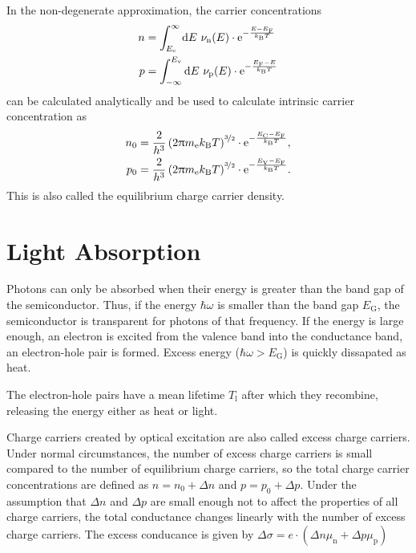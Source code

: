 In the non-degenerate approximation, the carrier concentrations
\begin{align*}
	n &= \int_{E_\text{c}}^\infty\d E\ \nu_\text{n}(E)\cdot\e^{-\frac{E-E_\text{F}}{k_\text{B}T}} \\
	p &= \int_{-\infty}^{E_\text{v}}\d E\ \nu_\text{p}(E)\cdot\e^{-\frac{E_\text{F}-E}{k_\text{B}T}}
\end{align*}
can be calculated analytically and be used to calculate intrinsic carrier concentration as
\begin{alignat*}{1}
	n_0 &= \frac{2}{h^3}	\left(2 \uppi m_\text{e} k_\text{B} T \right)^{\nicefrac{3}{2}} \cdot	\mathrm{e}^{-\frac{E_\text{C} - E_\text{F}}{k_\text{B}T}},\\
	p_0 &= \frac{2}{h^3}	\left(2 \uppi m_\text{e} k_\text{B} T \right)^{\nicefrac{3}{2}} \cdot	\mathrm{e}^{-\frac{E_\text{V} - E_\text{F}}{k_\text{B}T}}.
\end{alignat*}
This is also called the equilibrium charge carrier density.

\section{Light Absorption}
Photons can only be absorbed when their energy is greater than the band gap of the semiconductor.
Thus, if the energy $\hbar \omega$ is smaller than the band gap $E_\text{G}$, the semiconductor is transparent for photons of that frequency.
If the energy is large enough, an electron is excited from the valence band into the conductance band, an electron-hole pair is formed.
Excess energy ($\hbar \omega > E_\text{G}$) is quickly dissapated as heat.

The electron-hole pairs have a mean lifetime $T_\text{l}$ after which they recombine, releasing the energy either as heat or light.

Charge carriers created by optical excitation are also called excess charge carriers.
Under normal circumstances, the number of excess charge carriers is small compared to the number of equilibrium charge carriers, so the total charge carrier concentrations are defined as $n = n_0 + \Delta n$ and $p = p_0 + \Delta p$.
Under the assumption that $\Delta n$ and $\Delta p$ are small enough not to affect the properties of all charge carriers, the total conductance changes linearly with the number of excess charge carriers.
The excess conducance is given by $\Delta \sigma = e \cdot \left( \Delta n \mu_\text{n} + \Delta p \mu_\text{p} \right)$
